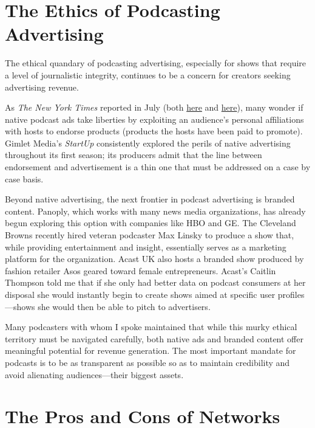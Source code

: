 \documentclass[notoc, symmetric, nobib, nols]{towcenter-guideto-book}
\begin{document}
\section{The Ethics of Podcasting Advertising}

The ethical quandary of podcasting advertising, especially for shows that require a level of journalistic integrity, continues to be a concern for creators seeking advertising revenue. 

As \textit{The New York Times} reported in July (both \href{http://www.nytimes.com/2015/07/27/business/media/ads-for-podcasts-test-the-line-between-story-and-sponsor.html?_r=0}{here} and \href{http://www.nytimes.com/2015/07/28/opinion/joe-nocera-stepping-on-a-slippery-slope.html}{here}), many wonder if native podcast ads take liberties by exploiting an audience's personal affiliations with hosts to endorse products (products the hosts have been paid to promote).\autocites{adlin, slippery} Gimlet Media's \textit{StartUp} consistently explored the perils of native advertising throughout its first season; its producers admit that the line between endorsement and advertisement is a thin one that must be addressed on a case by case basis.\autocite{startup} 

Beyond native advertising, the next frontier in podcast advertising is branded content. Panoply, which works with many news media organizations, has already begun exploring this option with companies like HBO and GE.\autocite{bowers} The Cleveland Browns recently hired veteran podcaster Max Linsky to produce a show that, while providing entertainment and insight, essentially serves as a marketing platform for the organization.\autocite{hotpodbrowns} Acast UK also hosts a branded show produced by fashion retailer Asos geared toward female entrepreneurs. Acast's Caitlin Thompson told me that if she only had better data on podcast consumers at her disposal she would instantly begin to create shows aimed at specific user profiles---shows she would then be able to pitch to advertisers.\autocite{thompson} 

Many podcasters with whom I spoke maintained that while this murky ethical territory must be navigated carefully, both native ads and branded content offer meaningful potential for revenue generation. The most important mandate for podcasts is to be as transparent as possible so as to maintain credibility and avoid alienating audiences---their biggest assets. 
       
\section{The Pros and Cons of Networks}
\end{document}
